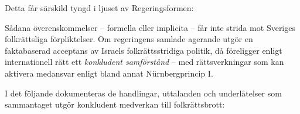 Detta får särskild tyngd i ljuset av Regeringsformen:


Sådana överenskommelser – formella eller implicita – får inte strida mot Sveriges folkrättsliga förpliktelser. Om regeringens samlade agerande utgör en faktabaserad acceptans av Israels folkrättsstridiga politik, då föreligger enligt internationell rätt ett \textit{konkludent samförstånd} – med rättsverkningar som kan aktivera medansvar enligt bland annat Nürnbergprincip I.

I det följande dokumenteras de handlingar, uttalanden och underlåtelser som sammantaget utgör konkludent medverkan till folkrättsbrott:

